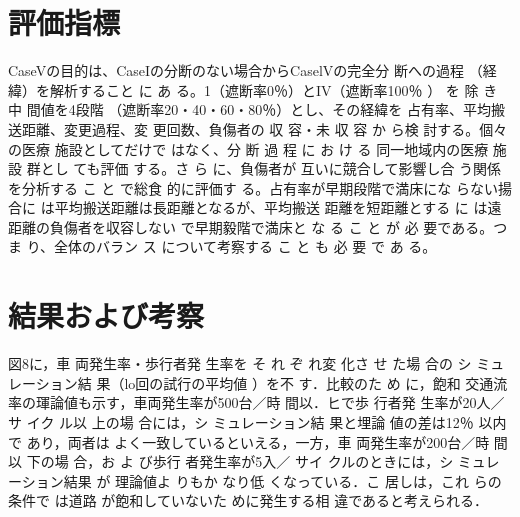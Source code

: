 \section{評価指標}

CaseVの目的は、CaseIの分断のない場合からCaselVの完全分 断への過程 （経緯）を解析すること に あ る。1（遮断率0％）とIV（遮断率100％ ） を 除 き 中 間値を4段階 （遮断率20・40・60・80％）とし、その経緯を 占有率、平均搬送距離、変更過程、変 更回数、負傷者の 収 容・未 収 容 か ら検 討する。個々の医療 施設としてだけで はなく、分 断 過 程 に お け る 同一地域内の医療 施設 群とし ても評価 する。さ ら に、負傷者が 互いに競合して影響し合 う関係 を分析する こ と で総食 的に評価す る。占有率が早期段階で満床にな らない揚合に は平均搬送距離は長距離となるが、平均搬送 距離を短距離とする に は遠距離の負傷者を収容しない で早期毅階で満床と な る こ と が 必 要である。つま り、全体のバラン ス について考察する こ と も 必 要 で あ る。

\section{結果および考察}

図8に，車 両発生率・歩行者発 生率を そ れ ぞ れ変 化さ せ た場 合の シ ミュレーション結 果（lo回の試行の平均値 ）を不 す．比較のた め に，飽和 交通流率の琿論値も示す，車両発生率が500台／時 間以．ヒで歩 行者発 生率が20人／サ イク ル以 上の場 合には，シ ミュレーション結 果と埋論 値の差は12％ 以内で あり，両者は よく一致しているといえる，一方，車 両発生率が200台／時 間以 下の場 合，お よ び歩行 者発生率が5入／ サイ クルのときには，シ ミュレーション結果 が 理論値よ りもか なり低 くなっている．こ 居しは，これ らの条件で は道路 が飽和していないた めに発生する相 違であると考えられる．
